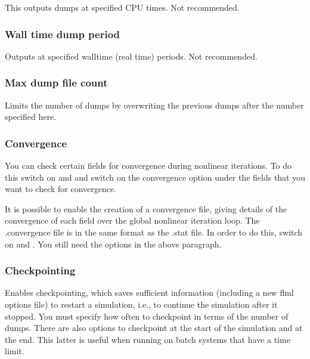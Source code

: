 This outputs dumps at specified CPU times. Not recommended.

\subsubsection{Wall time dump period}

Outputs at specified walltime (real time) periods. Not recommended.

\subsubsection{Max dump file count}

Limits the number of dumps by overwriting the previous dumps after the number specified here.

\subsubsection{Convergence}

You can check certain fields for convergence during nonlinear iterations.  To do this switch on  and  and switch on the convergence option under the fields that you want to check for convergence.

It is possible to enable the creation of a convergence file, giving details of the convergence of each field over the global nonlinear iteration loop. The .convergence file is in the same format as the .stat file. In order to do this, switch on
  and .  You still need the options in the above paragraph.

\subsubsection{Checkpointing}
\label{sec:configuring_fluidity_checkpointing}
Enables checkpointing, which saves sufficient information (including a new flml options file) to restart a simulation, i.e., to continue the simulation after it stopped. You must specify how often to checkpoint in terms of the number of dumps. There
are also options to checkpoint at the start of the simulation and at the
end. This latter is useful when running on batch systems that have a time
limit.

